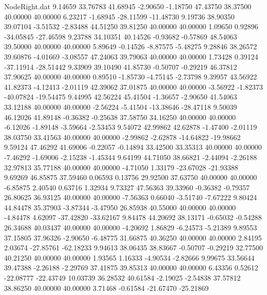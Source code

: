 \begin{filecontents}{NodeRight.dat}
   9.14659   33.76783   41.68945    -2.90650   -1.18750   47.43750   38.37500   40.00000   40.00000    6.23217   -1.68945  -28.11599  -11.48730
   9.19736   38.90350   39.07104    -3.51532   -2.83488   44.51250   39.81250   40.00000   40.00000    1.09650    0.92896  -34.05845  -27.46598
   9.23788   34.10351   40.14526    -0.93682   -0.57869   48.54063   39.50000   40.00000   40.00000    5.89649   -0.14526   -8.87575   -5.48275
   9.28846   38.26572   39.60876    -4.01669   -3.08557   47.24063   39.79063   40.00000   40.00000    1.73428    0.39124  -37.11914  -28.51442
   9.33909   39.10490   41.85730    -0.50707   -0.29219   46.37812   37.90625   40.00000   40.00000    0.89510   -1.85730   -4.75145   -2.73798
   9.39957   43.56922   41.82373    -4.12413   -2.01119   42.39062   37.01875   40.00000   40.00000   -3.56922   -1.82373  -40.07824  -19.54475
   9.44995   42.56224   45.41504    -1.36657   -2.90650   41.54063   33.12188   40.00000   40.00000   -2.56224   -5.41504  -13.38646  -28.47118
   9.50039   46.12026   41.89148    -0.36382   -0.25638   37.58750   34.16250   40.00000   40.00000   -6.12026   -1.89148   -3.59664   -2.53453
   9.54072   42.99862   42.62878    -1.47400   -2.01119   38.03750   33.41563   40.00000   40.00000   -2.99862   -2.62878  -14.64822  -19.98662
   9.59124   47.46292   41.69006    -0.22057   -0.14894   33.42500   33.35313   40.00000   40.00000   -7.46292   -1.69006   -2.15238   -1.45344
   9.64199   44.71050   38.66821    -2.44094   -2.26188   32.97813   35.77188   40.00000   40.00000   -4.71050    1.33179  -23.67028  -21.93388
   9.69269   46.85875   37.59460     0.06593    0.13756   29.92500   37.63750   40.00000   40.00000   -6.85875    2.40540    0.63716    1.32934
   9.73327   47.56363   39.33960    -0.36382   -0.79357   26.80625   36.93125   40.00000   40.00000   -7.56363    0.66040   -3.51740   -7.67222
   9.80424   44.84478   35.37903    -3.87344   -3.47950   26.85938   40.55000   40.00000   40.00000   -4.84478    4.62097  -37.42820  -33.62167
   9.84478   44.20692   38.13171    -0.65032   -0.54288   26.34688   40.03437   40.00000   40.00000   -4.20692    1.86829   -6.24573   -5.21389
   9.89553   37.15805   37.96326    -2.90650   -6.48775   31.66875   40.36250   40.00000   40.00000    2.84195    2.03674  -27.85761  -62.18233
   9.94613   38.06435   38.83667    -0.50707   -0.29219   32.77500   40.21250   40.00000   40.00000    1.93565    1.16333   -4.90534   -2.82666
   9.99675   33.56644   39.47388    -2.26188   -2.29769   37.41875   39.85313   40.00000   40.00000    6.43356    0.52612  -22.08777  -22.43749
  10.03739   36.28532   40.61584    -2.19025   -2.54838   37.57812   38.86250   40.00000   40.00000    3.71468   -0.61584  -21.67470  -25.21869

\end{filecontents}
